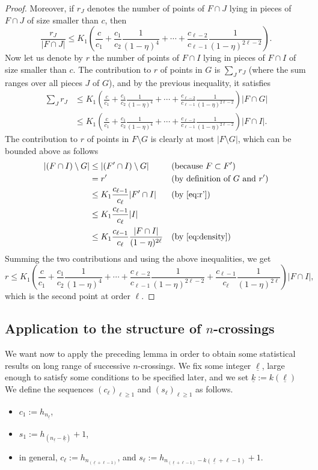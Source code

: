 \documentclass[AHL,Unicode,longabstracts]{cedram}
\newcommand{\egdef}{:=}
\newcommand{\lb}{\underline{\ell}}
\newcommand{\kb}{\underline{k}}
\begin{document}
\begin{proof}
Moreover, if $r_J$ denotes the number of points of $F\cap J$ lying in pieces of $F\cap J$ of size smaller than $c$, then
\[
\frac{r_J}{|F\cap J|} \le K_1\left(\frac{c}{c_1} + \frac{c_1}{c_2}
\frac{1}{(1-\eta)^4} + \cdots + \frac{c_{\ell-2}}{c_{\ell-1}}
\frac{1}{(1-\eta)^{2{\ell-2}}}\right).
\]
Now let us denote by $r$ the number of points of $F\cap I$ lying in pieces of $F\cap I$ of size smaller than $c$. The contribution to $r$ of points in $G$ is $\sum_J r_J$ (where the sum ranges over all pieces $J$ of $G$), and by the previous inequality, it satisfies
\begin{align*}
\sum_J r_J & \le K_1\left(\frac{c}{c_1} + \frac{c_1}{c_2} \frac{1}{(1-\eta)^4} + \cdots + \frac{c_{\ell-2}}{c_{\ell-1}}
\frac{1}{(1-\eta)^{2{\ell-2}}}\right) |F\cap G| \\
& \le K_1\left(\frac{c}{c_1} + \frac{c_1}{c_2}
\frac{1}{(1-\eta)^4} + \cdots + \frac{c_{\ell-2}}{c_{\ell-1}}
\frac{1}{(1-\eta)^{2{\ell-2}}}\right) |F\cap I|.
\end{align*}
The contribution to $r$ of points in $F\setminus G$ is clearly at most $|F\setminus G|$, which can be bounded above as follows
\begin{align*}
|(F\cap I)\setminus G| & \le |(F'\cap I)\setminus G| &&\text{(because $F\subset F'$)}\\
& = r' &&\text{(by definition of $G$ and $r'$)}\\
& \le K_1 \frac{c_{\ell-1}}{c_\ell}|F'\cap I| &&\text{(by~\eqref{eq:r'})}\\
& \le K_1 \frac{c_{\ell-1}}{c_\ell}|I| \\
& \le K_1 \frac{c_{\ell-1}}{c_\ell} \frac{|F\cap I|}{(1-\eta)^{2\ell}} &&\text{(by~\eqref{eq:density})}
\end{align*}
Summing the two contributions and using the above inequalities, we get
\[
r \le K_1\left(\frac{c}{c_1} + \frac{c_1}{c_2}
\frac{1}{(1-\eta)^4} + \cdots + \frac{c_{\ell-2}}{c_{\ell-1}}
\frac{1}{(1-\eta)^{2{\ell-2}}} + \frac{c_{\ell-1}}{c_\ell} \frac{1}{(1-\eta)^{2\ell}} \right) |F\cap I|,
\]
which is the second point at order $\ell$.
\end{proof}

\subsection{Application to the structure of \texorpdfstring{$n$}{n}-crossings}\label{sec:application}

We want now to apply the preceding lemma in order to obtain some statistical results on long range of successive $n$-crossings. We fix some integer $\lb$, large enough to satisfy some conditions to be specified later, and we set $\kb\egdef k(\lb)$ We define\pagebreak{} the sequences ${(c_\ell)}_{\ell\ge1}$ and ${(s_\ell)}_{\ell\ge1}$ as follows.
\begin{itemize}
\item $c_1\egdef h_{n_{\lb}}$,
\item $s_1\egdef h_{(n_{\lb}-\kb)}+1$,
\item in general, $c_\ell\egdef h_{n_{(\lb+\ell-1)}}$, and $s_\ell \egdef h_{n_{(\lb+\ell-1)}-k(\lb+\ell-1)} + 1$.
\end{itemize}
\end{document}
